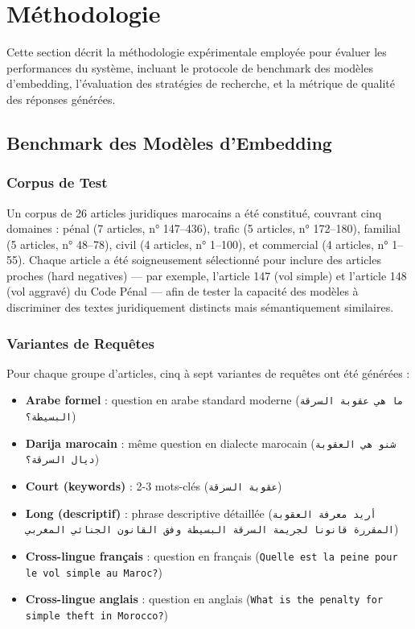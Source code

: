 \section{Méthodologie}

Cette section décrit la méthodologie expérimentale employée pour évaluer
les performances du système, incluant le protocole de benchmark des modèles
d'embedding, l'évaluation des stratégies de recherche, et la métrique de
qualité des réponses générées.

\subsection{Benchmark des Modèles d'Embedding}

\subsubsection{Corpus de Test}

Un corpus de 26 articles juridiques marocains a été constitué, couvrant cinq
domaines : pénal (7 articles, n° 147--436), trafic (5 articles, n° 172--180),
familial (5 articles, n° 48--78), civil (4 articles, n° 1--100), et
commercial (4 articles, n° 1--55). Chaque article a été soigneusement
sélectionné pour inclure des articles proches (hard negatives) — par exemple,
l'article 147 (vol simple) et l'article 148 (vol aggravé) du Code Pénal —
afin de tester la capacité des modèles à discriminer des textes
juridiquement distincts mais sémantiquement similaires.

\subsubsection{Variantes de Requêtes}

Pour chaque groupe d'articles, cinq à sept variantes de requêtes ont été
générées :

\begin{itemize}
    \item \textbf{Arabe formel} : question en arabe standard moderne
    (\textarabic{\texttt{ما هي عقوبة السرقة البسيطة؟}})
    \item \textbf{Darija marocain} : même question en dialecte marocain
    (\textarabic{\texttt{شنو هي العقوبة ديال السرقة؟}})
    \item \textbf{Court (keywords)} : 2-3 mots-clés
    (\textarabic{\texttt{عقوبة السرقة}})
    \item \textbf{Long (descriptif)} : phrase descriptive détaillée
    (\textarabic{\texttt{أريد معرفة العقوبة المقررة قانونا لجريمة السرقة البسيطة وفق
    القانون الجنائي المغربي}})
    \item \textbf{Cross-lingue français} : question en français
    (\texttt{Quelle est la peine pour le vol simple au Maroc?})
    \item \textbf{Cross-lingue anglais} : question en anglais
    (\texttt{What is the penalty for simple theft in Morocco?})
\end{itemize}

